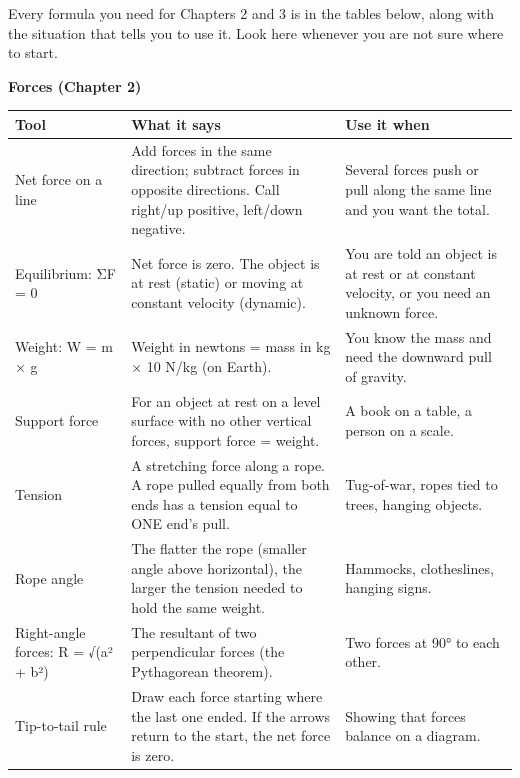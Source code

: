 \documentclass[
]{article}
\newcounter{none} %
\begin{document}
Every formula you need for Chapters 2 and 3 is in the tables below,
along with the situation that tells you to use it. Look here whenever
you are not sure where to start.

\textbf{Forces (Chapter 2)}

{\def\LTcaptype{none} %
\begin{longtable}[]{@{}
  >{\raggedright\arraybackslash}p{}
  >{\raggedright\arraybackslash}p{}
  >{\raggedright\arraybackslash}p{}@{}}
\toprule\noalign{}
\begin{minipage}[b]{\linewidth}\raggedright
Tool
\end{minipage} & \begin{minipage}[b]{\linewidth}\raggedright
What it says
\end{minipage} & \begin{minipage}[b]{\linewidth}\raggedright
Use it when
\end{minipage} \\
\midrule\noalign{}
\endhead
\bottomrule\noalign{}
\endlastfoot
Net force on a line & Add forces in the same direction; subtract forces
in opposite directions. Call right/up positive, left/down negative. &
Several forces push or pull along the same line and you want the
total. \\
Equilibrium: ΣF = 0 & Net force is zero. The object is at rest (static)
or moving at constant velocity (dynamic). & You are told an object is at
rest or at constant velocity, or you need an unknown force. \\
Weight: W = m × g & Weight in newtons = mass in kg × 10 N/kg (on Earth).
& You know the mass and need the downward pull of gravity. \\
Support force & For an object at rest on a level surface with no other
vertical forces, support force = weight. & A book on a table, a person
on a scale. \\
Tension & A stretching force along a rope. A rope pulled equally from
both ends has a tension equal to ONE end's pull. & Tug-of-war, ropes
tied to trees, hanging objects. \\
Rope angle & The flatter the rope (smaller angle above horizontal), the
larger the tension needed to hold the same weight. & Hammocks,
clotheslines, hanging signs. \\
Right-angle forces: R = √(a² + b²) & The resultant of two perpendicular
forces (the Pythagorean theorem). & Two forces at 90° to each other. \\
Tip-to-tail rule & Draw each force starting where the last one ended. If
the arrows return to the start, the net force is zero. & Showing that
forces balance on a diagram. \\
\end{longtable}
}
\end{document}
